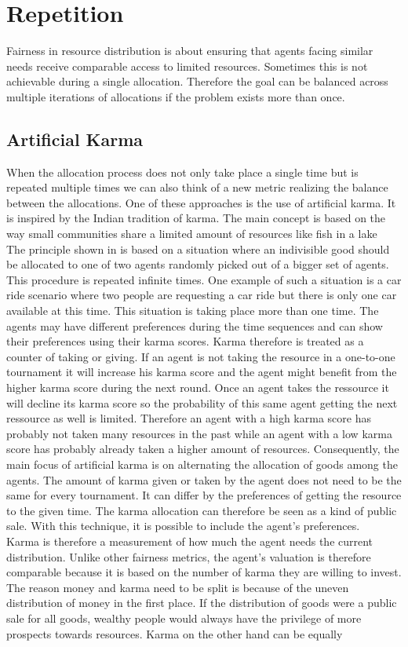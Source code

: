 \documentclass[german, a4paper, 11pt, oneside]{scrbook}
\begin{document}
\section{Repetition}
Fairness in resource distribution is about ensuring that agents facing similar needs receive comparable access to limited resources. Sometimes this is not achievable during a single allocation. Therefore the goal can be balanced across multiple iterations of allocations if the problem exists more than once.\cite{Elokda.2023}
\subsection{Artificial Karma}
When the allocation process does not only take place a single time but is repeated multiple times we can also think of a new metric realizing the balance between the allocations. One of these approaches is the use of artificial karma. It is inspired by the Indian tradition of karma. The main concept is based on the way small communities share a limited amount of resources like fish in a lake \cite{.c} \\The principle shown in \cite{Elokda.2023} is based on a situation where an indivisible good should be allocated to one of two agents randomly picked out of a bigger set of agents. This procedure is repeated infinite times. One example of such a situation is a car ride scenario where two people are requesting a car ride but there is only one car available at this time. This situation is taking place more than one time. The agents may have different preferences during the time sequences and can show their preferences using their karma scores. Karma therefore is treated as a counter of taking or giving. If an agent is not taking the resource in a one-to-one tournament it will increase his karma score and the agent might benefit from the higher karma score during the next round. Once an agent takes the ressource it will decline its karma score so the probability of this same agent getting the next ressource as well is limited. Therefore an agent with a high karma score has probably not taken many resources in the past while an agent with a low karma score has probably already taken a higher amount of resources. Consequently, the main focus of artificial karma is on alternating the allocation of goods among the agents.  The amount of karma given or taken by the agent does not need to be the same for every tournament. It can differ by the preferences of getting the resource to the given time. The karma allocation can therefore be seen as a kind of public sale. With this technique, it is possible to include the agent's preferences. \\Karma is therefore a measurement of how much the agent needs the current distribution. Unlike other fairness metrics, the agent's valuation is therefore comparable because it is based on the number of karma they are willing to invest. \\The reason money and karma need to be split is because of the uneven distribution of money in the first place. If the distribution of goods were a public sale for all goods, wealthy people would always have the privilege of more prospects towards resources. Karma on the other hand can be equally 
\end{document}
